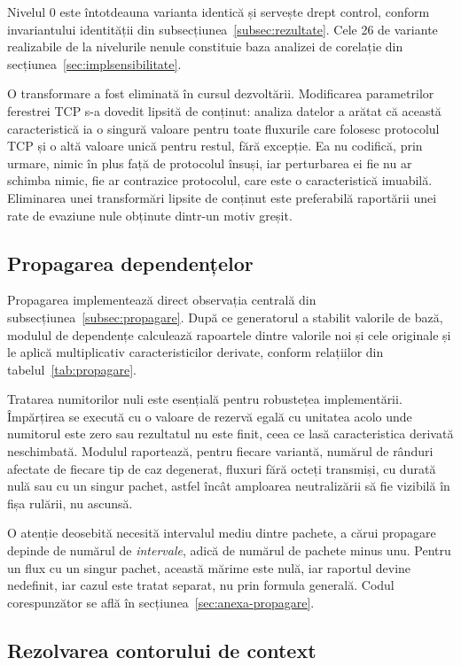 Nivelul 0 este întotdeauna varianta identică și servește drept control, conform invariantului identității din subsecțiunea~\ref{subsec:rezultate}. Cele 26 de variante realizabile de la nivelurile nenule constituie baza analizei de corelație din secțiunea~\ref{sec:implsensibilitate}.

O transformare a fost eliminată în cursul dezvoltării. Modificarea parametrilor ferestrei TCP s-a dovedit lipsită de conținut: analiza datelor a arătat că această caracteristică ia o singură valoare pentru toate fluxurile care folosesc protocolul TCP și o altă valoare unică pentru restul, fără excepție. Ea nu codifică, prin urmare, nimic în plus față de protocolul însuși, iar perturbarea ei fie nu ar schimba nimic, fie ar contrazice protocolul, care este o caracteristică imuabilă. Eliminarea unei transformări lipsite de conținut este preferabilă raportării unei rate de evaziune nule obținute dintr-un motiv greșit.

\subsection{Propagarea dependențelor}\label{subsec:implpropagare}

Propagarea implementează direct observația centrală din subsecțiunea~\ref{subsec:propagare}. După ce generatorul a stabilit valorile de bază, modulul de dependențe calculează rapoartele dintre valorile noi și cele originale și le aplică multiplicativ caracteristicilor derivate, conform relațiilor din tabelul~\ref{tab:propagare}.

Tratarea numitorilor nuli este esențială pentru robustețea implementării. Împărți\-rea se execută cu o valoare de rezervă egală cu unitatea acolo unde numitorul este zero sau rezultatul nu este finit, ceea ce lasă caracteristica derivată neschimbată. Modulul raportează, pentru fiecare variantă, numărul de rânduri afectate de fiecare tip de caz degenerat, fluxuri fără octeți transmiși, cu durată nulă sau cu un singur pachet, astfel încât amploarea neutralizării să fie vizibilă în fișa rulării, nu ascunsă.

O atenție deosebită necesită intervalul mediu dintre pachete, a cărui propagare depinde de numărul de \emph{intervale}, adică de numărul de pachete minus unu. Pentru un flux cu un singur pachet, această mărime este nulă, iar raportul devine nedefinit, iar cazul este tratat separat, nu prin formula generală. Codul corespunzător se află în secțiunea~\ref{sec:anexa-propagare}.

\subsection{Rezolvarea contorului de context}\label{subsec:ct}

